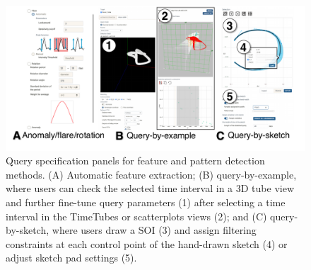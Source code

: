 \begin{figure}[t]
    \begin{minipage}{\columnwidth}
        \begin{center}
            \includegraphics[width=.99\linewidth]{figures/QuerySpecificationPanel.pdf}
        \end{center}
        \begin{minipage}{\columnwidth}
        \caption{Query specification panels for feature and pattern detection methods. (A) Automatic feature extraction; (B) query-by-example, where users can check the selected time interval in a 3D tube view and further fine-tune query parameters (1) after selecting a time interval in the TimeTubes or scatterplots views (2);
         and (C) query-by-sketch, where users draw a SOI (3) and assign filtering constraints at each control point of the hand-drawn sketch (4) or adjust sketch pad settings (5).}
        \label{fig:querySpecificationPanel}
        \end{minipage}
    \end{minipage}
\end{figure}

